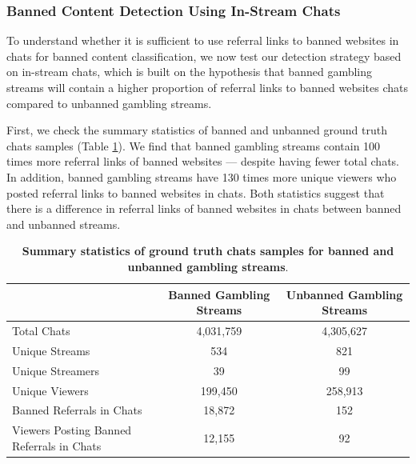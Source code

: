 \documentclass[a4paper,12pt]{article}
\begin{document}


\subsubsection{Banned Content Detection Using In-Stream Chats}\label{inference-step-chats}

To understand whether it is sufficient to use referral links to banned websites in chats for banned content classification, we now test our detection strategy based on in-stream chats, which is built on the hypothesis that banned gambling streams will contain a higher proportion of referral links to banned websites chats compared to unbanned gambling streams. 

First, we check the summary statistics of banned and unbanned ground truth chats samples (Table \ref{table:chat-gt-summary-stats-main}). We find that banned gambling streams contain 100 times more referral links of banned websites — despite having fewer total chats. In addition, banned gambling streams have 130 times more unique viewers who posted referral links to banned websites in chats. Both statistics suggest that there is a difference in referral links of banned websites in chats between banned and unbanned streams. 

\begin{table}[!htb]
\small
\centering
\renewcommand{\arraystretch}{1.2}
\begin{threeparttable}
\begin{tabular}{lcc}
\hline 
 & Banned Gambling Streams & Unbanned Gambling Streams \\
\hline
Total Chats & 4,031,759 & 4,305,627 \\
Unique Streams & 534 & 821 \\
Unique Streamers & 39 & 99 \\
Unique Viewers & 199,450 & 258,913 \\
Banned Referrals in Chats & 18,872 & 152 \\
Viewers Posting Banned Referrals in Chats & 12,155 & 92 \\
\hline 
\end{tabular}
\end{threeparttable}
\vspace{0.5em} 
\caption{\textbf{Summary statistics of ground truth chats samples for banned and unbanned gambling streams}.}
\label{table:chat-gt-summary-stats-main}
\end{table}
\end{document}
